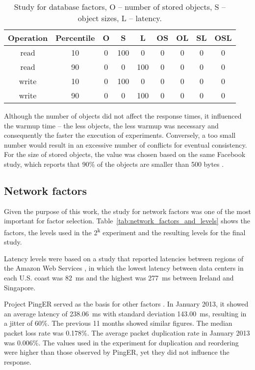 \documentclass[man,floatsintext,12pt]{apa6}
\begin{document}
\begin{table}[h!]
  \caption{Study for database factors, O -- number of stored objects, S -- object
sizes, L -- latency.}
  \begin{tabular}{ccccccccc}         \toprule
Operation & Percentile & O & S & L & OS & OL & SL & OSL\\ \midrule

read & 10 & 0 & 100 & 0 & 0 & 0 & 0 & 0 \\

read & 90 & 0 & 0 & 100 & 0 & 0 & 0 & 0 \\

write & 10 & 0 & 100 & 0 & 0 & 0 & 0 & 0 \\

write & 90 & 0 & 0 & 100 & 0 & 0 & 0 & 0 \\ \bottomrule
  \end{tabular}
  \label{tab:estudo_para_fatores_de_banco_de_dados}
\end{table}

Although the number of objects did not affect the response times, it influenced
the warmup time -- the less objects, the less warmup was necessary and
consequently the faster the execution of experiments. Conversely, a too small
number would result in an excessive number of conflicts for eventual
consistency. For the size of stored objects, the value was chosen based on the
same Facebook study, which reports that 90\% of the objects are smaller than
500 bytes \parencite{Atikoglu2012}.

\subsection{Network factors}

Given the purpose of this work, the study for network factors was one of the
most important for factor selection. Table~\ref{tab:network_factors_and_levels}
shows the factors, the levels used in the 2\textsuperscript{k} experiment and
the resulting levels for the final study.

Latency levels were based on a study that reported latencies between regions of the
Amazon Web Services \parencite{Sovran2011}, in which the lowest latency between data
centers in each U.S. coast was 82~ms and the highest was 277~ms between Ireland
and Singapore.

Project PingER served as the basis for other factors \parencite{PingER2013}. In
January 2013, it showed an average latency of 238.06~ms with standard deviation
143.00~ms, resulting in a jitter of 60\%. The previous 11 months showed similar
figures. The median packet loss rate was 0.178\%. The average packet
duplication rate in January 2013 was 0.006\%. The values used in the experiment
for duplication and reordering were higher than those observed by PingER, yet
they did not influence the response.
\end{document}
